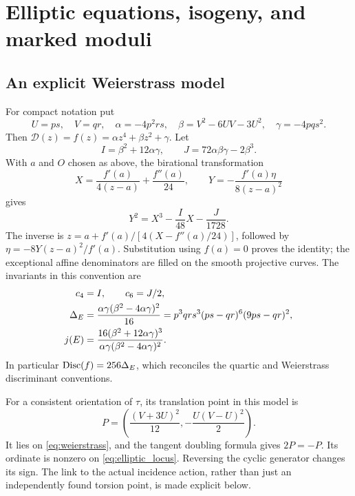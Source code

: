 \section{Elliptic equations, isogeny, and marked moduli}\label{sec:modular}
\subsection{An explicit Weierstrass model}
For compact notation put
\begin{equation}\label{eq:UV}
 U=ps,\quad V=qr,\quad
 \alpha=-4p^2rs,\quad\beta=V^2-6UV-3U^2,\quad\gamma=-4pqs^2.
\end{equation}
Then \(\mathcal D(z)=f(z)=\alpha z^4+\beta z^2+\gamma\). Let
\begin{equation}\label{eq:IJ}
 I=\beta^2+12\alpha\gamma,\qquad J=72\alpha\beta\gamma-2\beta^3.
\end{equation}
With \(a\) and \(O\) chosen as above, the birational transformation
\begin{equation}\label{eq:weierstrass_map}
 X=\frac{f'(a)}{4(z-a)}+\frac{f''(a)}{24},\qquad
 Y=-\frac{f'(a)\eta}{8(z-a)^2}
\end{equation}
gives
\begin{equation}\label{eq:weierstrass}
 Y^2=X^3-\frac I{48}X-\frac J{1728}.
\end{equation}
The inverse is \(z=a+f'(a)/[4(X-f''(a)/24)]\), followed by
\(\eta=-8Y(z-a)^2/f'(a)\). Substitution using \(f(a)=0\) proves the identity; the exceptional affine denominators are filled on the smooth projective curves. The invariants in this convention are
\begin{align}\label{eq:invariants}
 c_4&=I,\qquad c_6=J/2,\notag\\
 \Delta_E&=\frac{\alpha\gamma(\beta^2-4\alpha\gamma)^2}{16}
   =p^3qrs^3(ps-qr)^6(9ps-qr)^2,\notag\\
 j(E)&=\frac{16(\beta^2+12\alpha\gamma)^3}
                 {\alpha\gamma(\beta^2-4\alpha\gamma)^2}.
\end{align}
In particular \(\operatorname{Disc}(f)=256\Delta_E\), which reconciles the quartic and Weierstrass discriminant conventions.

For a consistent orientation of \(\tau\), its translation point in this model is
\begin{equation}\label{eq:P}
 P=\left(\frac{(V+3U)^2}{12},-\frac{U(V-U)^2}{2}\right).
\end{equation}
It lies on \eqref{eq:weierstrass}, and the tangent doubling formula gives \(2P=-P\). Its ordinate is nonzero on \eqref{eq:elliptic_locus}. Reversing the cyclic generator changes its sign. The link to the actual incidence action, rather than just an independently found torsion point, is made explicit below.

